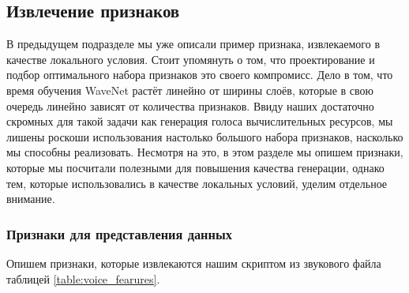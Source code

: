 \documentclass[../diploma.tex]{subfiles}
\begin{document}
\newpage
\subsection{Извлечение признаков}
В предыдущем подразделе мы уже описали пример признака, извлекаемого в качестве локального условия. Стоит упомянуть о том, что проектирование и подбор оптимального набора признаков это своего компромисс. 
Дело в том, что время обучения WaveNet растёт линейно от ширины слоёв, которые в свою очередь линейно зависят от количества признаков. Ввиду наших достаточно скромных для такой задачи как генерация голоса вычислительных ресурсов, мы лишены роскоши использования настолько большого набора признаков, насколько мы способны реализовать.
Несмотря на это, в этом разделе мы опишем признаки, которые мы посчитали полезными для повышения качества генерации, однако тем, которые использовались в качестве локальных условий, уделим отдельное внимание.




\subsubsection{Признаки для представления данных}
Опишем признаки, которые извлекаются нашим скриптом из звукового файла таблицей \ref{table:voice_fearures}.
\end{document}
